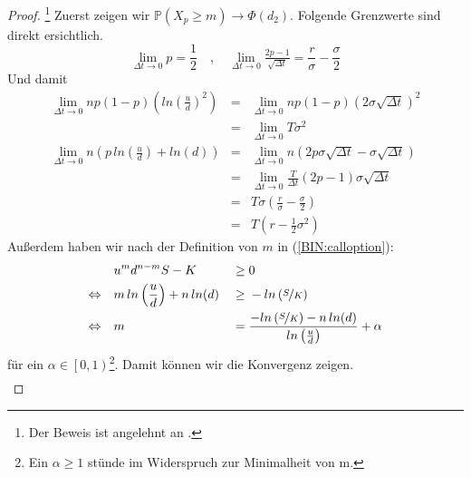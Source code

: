 \begin{proof}\footnote{Der Beweis ist angelehnt an \cite{GuentherJuengel}.}
Zuerst zeigen wir $ \mathbb{P} \left( X_p \geq m \right) \to \Phi\left(d_2\right) $. Folgende Grenzwerte sind direkt ersichtlich.
\begin{equation*}
\lim\limits_{\Delta t \to 0} p = \frac{1}{2} \quad , \quad 
\lim\limits_{\Delta t \to 0} \tfrac{2p - 1}{\sqrt{\Delta t}} = \frac{r}{\sigma} - \frac{\sigma}{2} 
\end{equation*}
Und damit
\[
\begin{array}{rcl}
\lim\limits_{\Delta t \to 0} np(1-p)\left(ln\left(\frac{u}{d}\right)^2\right)     & = & \lim\limits_{\Delta t \to 0} np(1-p)\left(2\sigma\sqrt{\Delta t}\right)^2 \\
                                                                                  & = & \lim\limits_{\Delta t \to 0} T\sigma^2 \\
\lim\limits_{\Delta t \to 0} n\left(p\, ln\left(\frac{u}{d}\right) + ln(d)\right) & = & \lim\limits_{\Delta t \to 0} n\left(2p\sigma\sqrt{\Delta t} - \sigma\sqrt{\Delta t}\right) \\
                                                                                  & = & \lim\limits_{\Delta t \to 0} \frac{T}{\Delta t} \left(2p - 1\right)\sigma\sqrt{\Delta t} \\
                                                                                  & = & T\sigma\left(\frac{r}{\sigma} - \frac{\sigma}{2}\right) \\
                                                                                  & = & T\left(r-\frac{1}{2}\sigma^2\right)
\end{array}
\]
Außerdem haben wir nach der Definition von $m$ in (\ref{BIN:calloption}):
\begin{alignat*}{4}
                      & u^md^{n-m}S-K                              & \; \geq \; & 0 \\
\Leftrightarrow \quad & m\, ln\left(\frac{u}{d}\right) + n\, ln(d) & \; \geq \; & -ln\left(\nicefrac{S}{K}\right) \\
\Leftrightarrow \quad & m                                          & \; = \;    & \frac{-ln\left(\nicefrac{S}{K}\right) - n\, ln(d)}{ln\left(\frac{u}{d}\right)} + \alpha
\end{alignat*}
für ein $\alpha \in \left[0,1\right)$\footnote{Ein $\alpha \geq 1$ stünde im Widerspruch zur Minimalheit von m.}. Damit können wir die Konvergenz zeigen.
\begin{eqnarray*}

\end{eqnarray*}
\end{proof}

